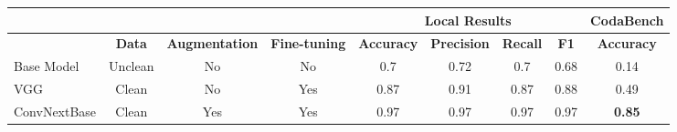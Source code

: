 \documentclass[11pt]{article}
\begin{document}
\begin{multicols}{2}
        \begin{table}[t]
 \hskip-1.5cm
\begin{tabular}{lccc|cccc|c|}
\cline{5-9}
                                                                                     & \multicolumn{1}{l}{}                                       & \multicolumn{1}{l}{}                                               & \multicolumn{1}{l|}{} & \multicolumn{4}{c|}{\cellcolor[HTML]{C0C0C0}Local Results}                                                                                                                                                      & \multicolumn{1}{l|}{\cellcolor[HTML]{C0C0C0}CodaBench} \\ \hline
\rowcolor[HTML]{C0C0C0} 
\multicolumn{1}{|l|}{\cellcolor[HTML]{C0C0C0}\textbf{Model}}                         & \multicolumn{1}{c|}{\cellcolor[HTML]{C0C0C0}\textbf{Data}} & \multicolumn{1}{c|}{\cellcolor[HTML]{C0C0C0}\textbf{Augmentation}} & \textbf{Fine-tuning}  & \multicolumn{1}{c|}{\cellcolor[HTML]{C0C0C0}\textbf{Accuracy}} & \multicolumn{1}{c|}{\cellcolor[HTML]{C0C0C0}\textbf{Precision}} & \multicolumn{1}{c|}{\cellcolor[HTML]{C0C0C0}\textbf{Recall}} & \textbf{F1}   & \textbf{Accuracy}                                      \\ \hline
\multicolumn{1}{|l|}{Base Model}                                                     & \multicolumn{1}{c|}{Unclean}                               & \multicolumn{1}{c|}{No}                                            & No                    & \multicolumn{1}{c|}{0.7}                                       & \multicolumn{1}{c|}{0.72}                                       & \multicolumn{1}{c|}{0.7}                                     & 0.68          & 0.14                                                   \\ \hline
\multicolumn{1}{|l|}{VGG}                                                            & \multicolumn{1}{c|}{Clean}                                 & \multicolumn{1}{c|}{No}                                            & Yes                   & \multicolumn{1}{c|}{0.87}                                      & \multicolumn{1}{c|}{0.91}                                       & \multicolumn{1}{c|}{0.87}                                    & 0.88          & 0.49                                                   \\ \hline
\multicolumn{1}{|l|}{ConvNextBase}                                                   & \multicolumn{1}{c|}{Clean}                                 & \multicolumn{1}{c|}{Yes}                                           & Yes                   & \multicolumn{1}{c|}{0.97}                                      & \multicolumn{1}{c|}{0.97}                                       & \multicolumn{1}{c|}{0.97}                                    & 0.97          & \textbf{0.85}                                          \\ \hline

\end{tabular}
\end{table}
\end{multicols}
\end{document}
